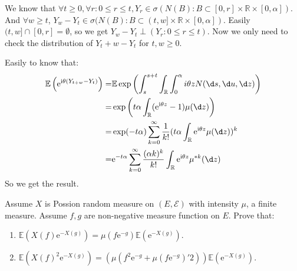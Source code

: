 \documentclass{ctexart}
\begin{document}
\begin{solution}
  We know that \(\forall t \geq 0,\forall r:0 \leq r \leq t,Y_r \in \sigma(N(B):B \subset [0,r]\times \mathbb{R} \times [0,\alpha])\).
  And \(\forall w \geq t\), \(Y_w-Y_t \in \sigma(N(B):B \subset (t,w] \times \mathbb{R} \times [0,\alpha])\).
  Easily \((t,w] \cap [0,r]=\emptyset\), so we get \(Y_w-Y_t \perp (Y_r:0 \leq r \leq t)\).
  Now we only need to check the distribution of \(Y_t+w - Y_t\) for \(t,w \geq 0\).

  Easily to know that:
  \[
    \begin{aligned}
      \mathbb{E}\left(\mathrm{e}^{\mathrm{i} \theta(Y_{t+w} -Y_t)}\right)= & \mathbb{E}\exp\left(\int_{s}^{s+t} \int_{\mathbb{R}}\int_{0}^\alpha i \theta z N(\d s,\d u,\d z) \right)                             \\
      =                                                                    & \exp\left(t \alpha \int_{\mathbb{R}}(\mathrm{e}^{\mathrm{i} \theta z}-1)\mu(\d z)\right)                                             \\
      =                                                                    & \exp(-t \alpha)\sum_{k=0}^{\infty}  \frac{1}{k!}(t \alpha \int_{\mathbb{R}}\mathrm{e}^{\mathrm{i} \theta z} \mu(\d z))^k             \\
      =                                                                    & \mathrm{e}^{-t \alpha} \sum_{k=0}^{\infty} \frac{(\alpha k)^k}{k!}\int_{\mathbb{R}} \mathrm{e}^{\mathrm{i} \theta z} \mu^{* k}(\d z)
    \end{aligned}
  \]
  So we get the result.
\end{solution}
\begin{problem}\label{pro:5}
  Assume \(X\) is Possion random measure on \((E,\mathcal{E})\) with intensity \(\mu\), a finite measure.
  Assume \(f,g\) are non-negative measure function on \(E\).
  Prove that:
  \begin{enumerate}
    \item \(\mathbb{E}(X(f)\mathrm{e}^{-X(g)})=\mu(f \mathrm{e}^{-g})\mathbb{E}(\mathrm{e}^{-X(g)})\).
    \item \(\mathbb{E}(X(f)^2 \mathrm{e}^{-X(g)})=(\mu(f^2 \mathrm{e}^{-g}+\mu(f \mathrm{e}^{-g})'2))\mathbb{E}(\mathrm{e}^{-X(g)})\).
  \end{enumerate}
\end{problem}
\end{document}
